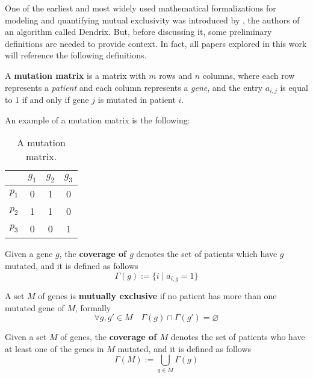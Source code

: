 One of the earliest \cite{survey} and most widely used mathematical formalizations for modeling and quantifying mutual exclusivity was introduced by \textcite{dendrix}, the authors of an algorithm called Dendrix. But, before discussing it, some preliminary definitions are needed to provide context. In fact, all papers explored in this work will reference the following definitions.

\begin{definition} \label{mut_matrix_def}
    A \textbf{mutation matrix} is a matrix with $m$ rows and $n$ columns, where each row represents a \textit{patient} and each column represents a \textit{gene}, and the entry $a_{i, j}$ is equal to 1 if and only if gene $j$ is mutated in patient $i$.
\end{definition}

\begin{example} \label{mutation_matrix}
    An example of a mutation matrix is the following:

    \begin{table}[H]
        \centering
        \begin{tabular}{c|ccc}
                  & $g_1$ & $g_2$ & $g_3$ \\
            \hline
            $p_1$ & 0 & 1 & 0 \\
            $p_2$ & 1 & 1 & 0 \\
            $p_3$ & 0 & 0 & 1 \\
        \end{tabular}
        \caption{A mutation matrix.}
    \end{table}
\end{example}

\begin{definition}
    Given a gene $g$, the \textbf{coverage of $g$} denotes the set of patients which have $g$ mutated, and it is defined as follows $$\Gamma(g) := \{i \mid a_{i, g} = 1\}$$ 
\end{definition}

\begin{definition} \label{mut_ex_first}
    A set $M$ of genes is \textbf{mutually exclusive} if no patient has more than one mutated gene of $M$, formally $$\forall g, g' \in M \quad \Gamma(g) \cap \Gamma(g') = \varnothing$$
\end{definition}

\begin{definition}
    Given a set $M$ of genes, the \textbf{coverage of $M$} denotes the set of patients who have at least one of the genes in $M$ mutated, and it is defined as follows $$\Gamma(M) := \bigcup_{g \in M}{\Gamma(g)}$$
\end{definition}

